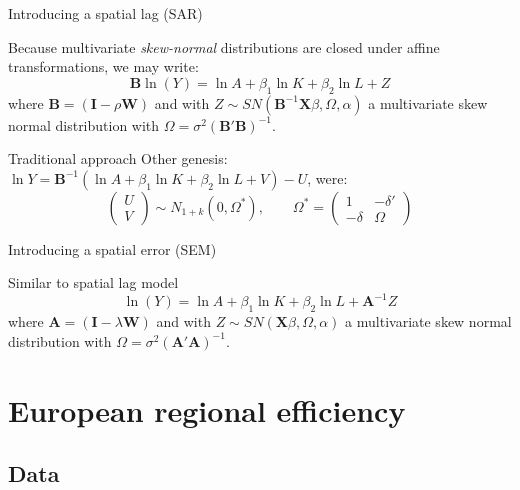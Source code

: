 \documentclass[ignorenonframetext]{beamer}
\begin{document}
\begin{frame}{Introducing a spatial lag (SAR)}
\begin{block}{Because multivariate \emph{skew-normal} distributions are closed under affine transformations, we may write:}
\begin{equation*}
\mathbf{B}\ln(Y) = \ln A + \beta_1 \ln K + \beta_2 \ln L+ Z
\label{spatialfrontier}
\end{equation*}
where $\mathbf{B} = \left(\mathbf{I} - \rho\mathbf{W}\right)$ and with $Z\sim SN (\mathbf{B}^{-1}\mathbf{X}\beta, \Omega, \alpha)$ a multivariate skew normal distribution with $\Omega = \sigma^2 (\mathbf{B} '\mathbf{B})^{-1}$. 
\end{block}
\pause
\begin{block}{Traditional approach}
Other genesis: $\ln Y =\mathbf{B}^{-1} \left( \ln A + \beta_1 \ln K + \beta_2 \ln L+ V\right) - U$, were:
\begin{equation*}
\begin{pmatrix} U \\ V \end{pmatrix} \sim N_{1+k}\left(0,\Omega^\ast\right), \qquad \Omega^\ast=\begin{pmatrix} 1 & -\delta' \\ -\delta & \Omega \end{pmatrix}
\end{equation*}
\end{block}
\end{frame}

\begin{frame}{Introducing a spatial error (SEM)}
\begin{block}{Similar to spatial lag model}
\begin{equation*}
\ln(Y) = \ln A + \beta_1 \ln K + \beta_2 \ln L+ \mathbf{A}^{-1}Z
\label{spatialfrontier}
\end{equation*}
where $\mathbf{A} = \left(\mathbf{I} - \lambda\mathbf{W}\right)$ and with $Z\sim SN (\mathbf{X}\beta, \Omega, \alpha)$ a multivariate skew normal distribution with $\Omega = \sigma^2 (\mathbf{A} '\mathbf{A})^{-1}$. 
\end{block}
\end{frame}

\section{European regional efficiency}

\subsection{Data}
\end{document}
